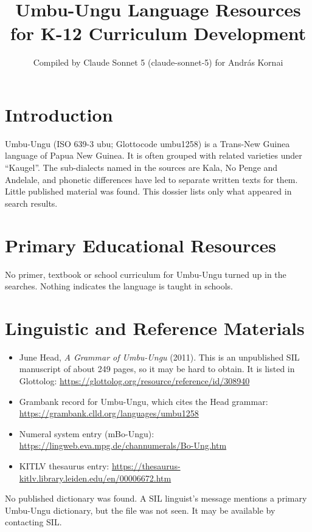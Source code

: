 \documentclass[12pt]{article}
\title{Umbu-Ungu Language Resources for K-12 Curriculum Development}
\author{Compiled by Claude Sonnet 5 (claude-sonnet-5) for Andr\'as Kornai}
\date{}
\begin{document}
\maketitle

\section{Introduction}
Umbu-Ungu (ISO 639-3 ubu; Glottocode umbu1258) is a Trans-New Guinea language of Papua New Guinea. It is often grouped with related varieties under ``Kaugel''. The sub-dialects named in the sources are Kala, No Penge and Andelale, and phonetic differences have led to separate written texts for them. Little published material was found. This dossier lists only what appeared in search results.

\section{Primary Educational Resources}
No primer, textbook or school curriculum for Umbu-Ungu turned up in the searches. Nothing indicates the language is taught in schools.

\section{Linguistic and Reference Materials}
\begin{itemize}
\item June Head, \emph{A Grammar of Umbu-Ungu} (2011). This is an unpublished SIL manuscript of about 249 pages, so it may be hard to obtain. It is listed in Glottolog: \url{https://glottolog.org/resource/reference/id/308940}
\item Grambank record for Umbu-Ungu, which cites the Head grammar: \url{https://grambank.clld.org/languages/umbu1258}
\item Numeral system entry (mBo-Ungu): \url{https://lingweb.eva.mpg.de/channumerals/Bo-Ung.htm}
\item KITLV thesaurus entry: \url{https://thesaurus-kitlv.library.leiden.edu/en/00006672.htm}
\end{itemize}
No published dictionary was found. A SIL linguist's message mentions a primary Umbu-Ungu dictionary, but the file was not seen. It may be available by contacting SIL.
\end{document}
